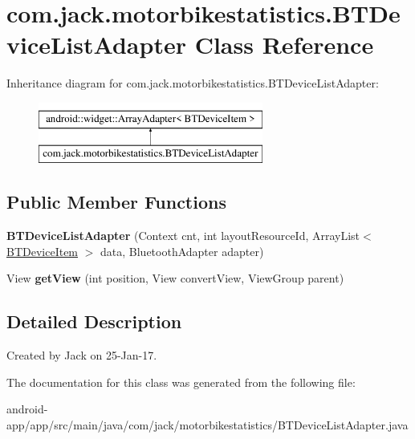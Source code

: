 \hypertarget{classcom_1_1jack_1_1motorbikestatistics_1_1_b_t_device_list_adapter}{}\section{com.\+jack.\+motorbikestatistics.\+B\+T\+Device\+List\+Adapter Class Reference}
\label{classcom_1_1jack_1_1motorbikestatistics_1_1_b_t_device_list_adapter}
Inheritance diagram for com.\+jack.\+motorbikestatistics.\+B\+T\+Device\+List\+Adapter\+:\begin{figure}[H]
\begin{center}
\leavevmode
\includegraphics[height=2.000000cm]{classcom_1_1jack_1_1motorbikestatistics_1_1_b_t_device_list_adapter}
\end{center}
\end{figure}
\subsection*{Public Member Functions}
\begin{DoxyCompactItemize}
\item 
\mbox{\label{classcom_1_1jack_1_1motorbikestatistics_1_1_b_t_device_list_adapter_a103bf9deb20f6a547537da994f66b92f}} 
{\bfseries B\+T\+Device\+List\+Adapter} (Context cnt, int layout\+Resource\+Id, Array\+List$<$ \hyperlink{classcom_1_1jack_1_1motorbikestatistics_1_1_b_t_device_item}{B\+T\+Device\+Item} $>$ data, Bluetooth\+Adapter adapter)
\item 
\mbox{\label{classcom_1_1jack_1_1motorbikestatistics_1_1_b_t_device_list_adapter_ab9e3230f609c8a8195c3e4e9c2b26b2e}} 
View {\bfseries get\+View} (int position, View convert\+View, View\+Group parent)
\end{DoxyCompactItemize}


\subsection{Detailed Description}
Created by Jack on 25-\/\+Jan-\/17. 

The documentation for this class was generated from the following file\+:\begin{DoxyCompactItemize}
\item 
android-\/app/app/src/main/java/com/jack/motorbikestatistics/B\+T\+Device\+List\+Adapter.\+java\end{DoxyCompactItemize}
